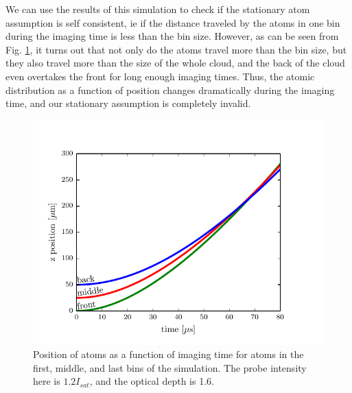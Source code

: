 \documentclass[12pt]{iopart}
\begin{document}
\par We can use the results of this simulation to check if the stationary atom assumption is self consistent, ie if the distance traveled by the atoms in one bin during the imaging time is less than the bin size. However, as can be seen from Fig. \ref{fig:atomTravel}, it turns out that not only do the atoms travel more than the bin size, but they also travel more than the size of the whole cloud, and the back of the cloud even overtakes the front for long enough imaging times. Thus, the atomic distribution as a function of position changes dramatically during the imaging time, and our stationary assumption is completely invalid. 
\begin{figure}
	\includegraphics{figure4.pdf}
\caption{Position of atoms as a function of imaging time for atoms in the first, middle, and last bins of the simulation. The probe intensity here is $1.2 I_{sat}$, and the optical depth is 1.6.}  
\label{fig:atomTravel}
\end{figure}
\end{document}
